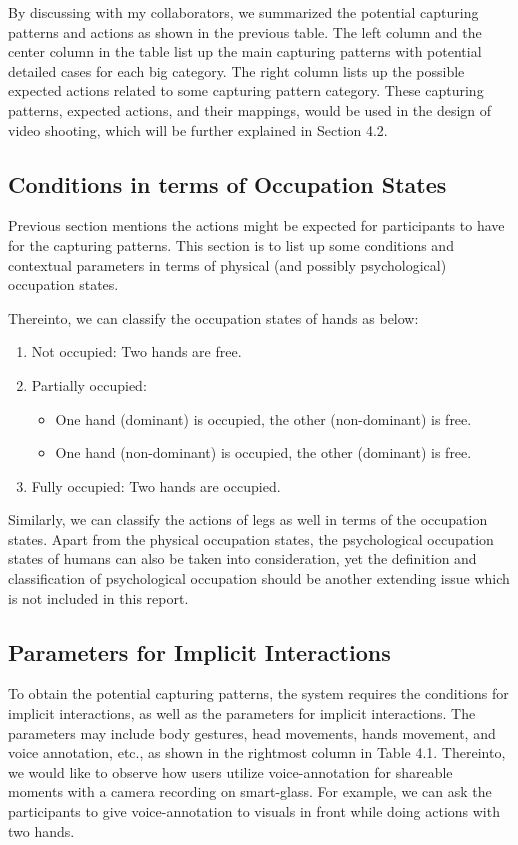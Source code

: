\documentclass[fyp]{socreport}
\begin{document}
By discussing with my collaborators, we summarized the potential capturing patterns and actions as shown in the previous table. The left column and the center column in the table list up the main capturing patterns with potential detailed cases for each big category. The right column lists up the possible expected actions related to some capturing pattern category. These capturing patterns, expected actions, and their mappings, would be used in the design of video shooting, which will be further explained in Section 4.2. 

\subsection{Conditions in terms of Occupation States}
Previous section mentions the actions might be expected for participants to have for the capturing patterns. This section is to list up some conditions and contextual parameters in terms of physical (and possibly psychological) occupation states.

Thereinto, we can classify the occupation states of hands as below:
\small
\begin{enumerate}
    \item Not occupied: Two hands are free.
    \item Partially occupied:
    \begin{itemize}
        \item One hand (dominant) is occupied, the other (non-dominant) is free.
        \item One hand (non-dominant) is occupied, the other (dominant) is free.
    \end{itemize}
    \item Fully occupied: Two hands are occupied. 
\end{enumerate}
\normalsize

Similarly, we can classify the actions of legs as well in terms of the occupation states. Apart from the physical occupation states, the psychological occupation states of humans can also be taken into consideration, yet the definition and classification of psychological occupation should be another extending issue which is not included in this report.

\subsection{Parameters for Implicit Interactions}
To obtain the potential capturing patterns, the system requires the conditions for implicit interactions, as well as the parameters for implicit interactions. The parameters may include body gestures, head movements, hands movement, and voice annotation, etc., as shown in the rightmost column in Table 4.1. Thereinto, we would like to observe how users utilize voice-annotation for shareable moments with a camera recording on smart-glass. For example, we can ask the participants to give voice-annotation to visuals in front while doing actions with two hands.
\end{document}
